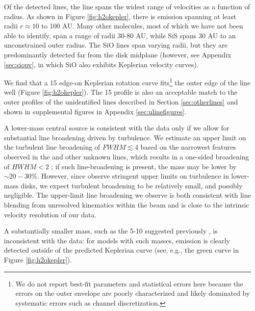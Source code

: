 \documentclass[twocolumn]{aastex62}
\begin{document}
Of the detected lines, the \water line spans the widest range of
velocities as a function of radius.  As shown in Figure \ref{fig:h2okepler},
there is \water emission spanning at least radii $r\approx 10$ to 100 AU.  Many
other molecules, most of
which we have not been able to identify, span a range of radii 30-80 AU, while SiS
spans 30 AU to an unconstrained outer radius.   The SiO lines span varying radii,
but they are predominantly detected far from the disk midplane (however,
see Appendix \ref{sec:siopv}, in which SiO also exhibits Keplerian velocity
curves).

We find that a 15 \msun edge-on Keplerian rotation curve fits\footnote{We do
not report best-fit parameters and statistical errors here because the errors
on the outer envelope are poorly characterized and likely dominated by
systematic errors such as channel discretization.} the outer edge of
the \water line well (Figure \ref{fig:h2okepler}).  The 15 \msun profile is
also an acceptable match to the outer profiles of the unidentified lines
described in Section \ref{sec:otherlines} and shown in supplemental figures in
Appendix \ref{sec:ulinefigures}.

A lower-mass central source is consistent with the \water data only if we allow
for substantial line broadening driven by turbulence.  We estimate an upper
limit on the turbulent line broadening of $FWHM\lesssim4$ \kms based on the
narrowest features observed in the \water and other unknown lines, which
results in a one-sided broadening of $HWHM<2$ \kms; if such line-broadening is
present, the mass may be lower by $\sim20-30\%$.
However, since \citet{Flaherty2017a} observe stringent upper limits on
turbulence in lower-mass disks, we expect turbulent broadening to be relatively
small, and possibly negligible.  The upper-limit line broadening we observe is
both consistent with line blending from unresolved kinematics within the beam
and is close to the intrinsic velocity resolution of our data.


A substantially smaller mass, such as the 5-10 \msun suggested previously
\citep{Plambeck2016a,Hirota2014a}, is inconsistent with the data: for models
with such masses, emission is clearly detected outside of the predicted
Keplerian curve (see, e.g., the green curve in Figure \ref{fig:h2okepler}).  
\end{document}
